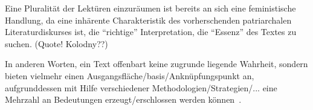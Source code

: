 Eine Pluralität der Lektüren einzuräumen ist bereits an sich eine feministische Handlung,
da eine inhärente Charakteristik des vorherschenden patriarchalen Literaturdiskurses ist, die ``richtige'' Interpretation, die ``Essenz'' des Textes zu suchen. (Quote! Kolodny??)
\begin{comment}
   * Pluralität (vlt in die Intro vorziehen)
     Annette Kolodny: "In my view, our purpose is not and should not be the formulation of any single reading method or potentially procrustean set of critical procedures[...] Instead, as I se it, our task is to initiate nothing less than a playful pluralism, responsice to the possibilities of multiple critical schools and methods, but captive of none.."

    ** Annette Kolodny: "we appropriate meaning from a text according to what we need (or desire) or, in other words, according to the critical assumptions or predispositions (conscious or not) that we bring to it. And we appropriate different meanings, or report different gleanings, at different times-even from the same text-according to our changed assumptions, circumstances, and requirements."
    ** Annette Kolodny: "It can provide that, but, I must add, too often it does not. Frequently our reading habits become fixed" <--- relation zum Kanon
\end{comment}

In anderen Worten, ein Text offenbart keine zugrunde liegende Wahrheit, sondern bieten vielmehr einen Ausgangsfläche/basis/Anknüpfungspunkt an, aufgrunddessen mit Hilfe verschiedener Methodologien/Strategien/... eine Mehrzahl an Bedeutungen erzeugt/erschlossen werden können~\autocite{Beehler1988}.

\begin{comment}
[Beehler1988]
"Consequently, what we teach in the English class-
room is not "literature" but ways of reading. By
helping students to identify different methods,
different positions from which to view a work, we
help them to realize that texts do not "reveal"
truth: they simply provide the field upon which
meanings can be produced."
\end{comment}


